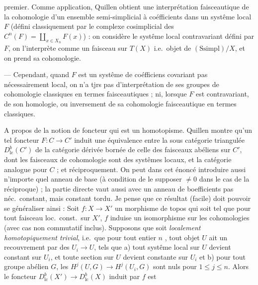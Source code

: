 \documentclass[11pt,a4paper]{article}
\begin{document}

premier. Comme application, Quillen obtient une interprétation faisceautique
de la cohomologie d'un ensemble semi-simplicial à coéfficients dans un systême
local  $F$ (défini classiquement par le complexe cosimplicial des
$C^{n}(F) = \coprod_{x \in X_{n}} F(x)$) : on considère le systême local
contravariant défini par $F$, on l'interprète comme un faisceau sur $T(X)$
i.e.\ objet de $(\mathrm{Ssimpl})/X$, et on prend sa cohomologie.

\marginal{\uncertain{$\prod$} !}

--- Cependant, quand $F$ est un systême de coéfficiens covariant pas
nécessairement local, on n'a tjrs pas d'interprétation de ses groupes de
cohomologie classiques en termes faisceautiques ; ni, lorsque $F$ est
contravariant, de son homologie, ou inversement de sa cohomologie faisceautique
en termes classiques.


A propos de la notion de foncteur qui est un homotopisme. Quillen montre qu'un
tel foncteur $F : C \to C'$ induit une équivalence entre la sous catégorie
triangulée $D^{b}_{\mathrm{lc}}(C')$ de la catégorie dérivée bornée de celle
des faisceaux abéliens sur $C'$, dont les faisceaux de cohomologie sont des
systêmes locaux, et la catégorie analogue pour $C$ ; et réciproquement. On
peut dans cet énoncé introduire aussi n'importe quel anneau de base (à
condition de le supposer $\neq 0$ dans le cas de la réciproque) ; la partie
directe vaut aussi avec un anneau de boefficients pas néc.\ constant, mais
constant tordu. Je pense que ce résultat (facile) doit pouvoir se généraliser
ainsi : Soit $f : X \to X'$ un morphisme de topos qui soit tel que pour tout
faisceau loc.\ const.\ sur $X'$, $f$ induise un isomorphisme sur les
cohomologies (avec cas non commutatif inclus). Supposons que  
soit \emph{localement homotopiquement trivial}, i.e.\ que
pour tout entier $n$ , tout objet $U$  ait un recouvrement par des
$U_{i} \to U$, tels que a) tout systême local sur $U$ devient constant sur
$U_{i}$, et toute section sur $U$ devient constante sur $U_{i}$ et b) pour
tout groupe abélien $G$, les $H^{j}(U, G) \to H^{j}(U_{i}, G)$ sont nuls pour
$1 \leq j \leq n$. Alors le foncteur $D^{b}_{\mathrm{lc}}(X') \to
D^{b}_{\mathrm{lc}}(X)$ induit par $f$ est
\end{document}
